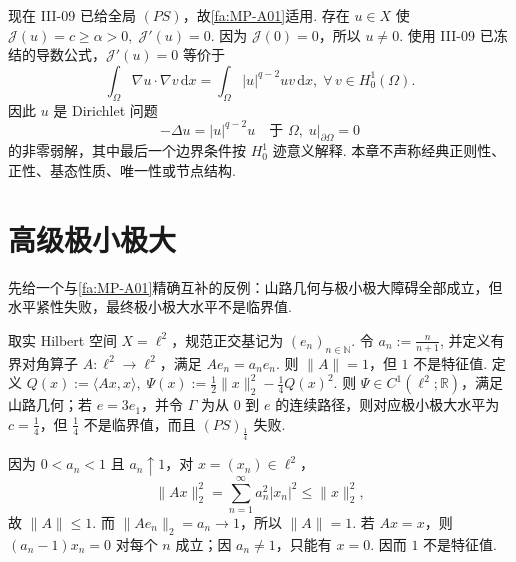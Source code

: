 现在 III-09 已给全局 \(\displaystyle(PS)\)，故\autoref{fa:MP-A01}适用. 存在 \(\displaystyle u\in X\) 使
\(\displaystyle \mathcal J(u)=c\geqslant\alpha>0, \; \mathcal J'(u)=0\).
因为 \(\displaystyle\mathcal J(0)=0\)，所以 \(\displaystyle u\neq0\). 使用 III-09 已冻结的导数公式，\(\displaystyle\mathcal J'(u)=0\) 等价于
\[
\int_\Omega\nabla u\mathbin{\cdot}\nabla v\,\mathrm{d}x
=
\int_\Omega|u|^{q-2}uv\,\mathrm{d}x,
\;
\forall\,v\in H_0^1(\Omega).
\]
因此 \(\displaystyle u\) 是 Dirichlet 问题
\[
-\Delta u=|u|^{q-2}u
\quad\text{于 }\Omega,
\;
u|_{\partial\Omega}=0
\]
的非零弱解，其中最后一个边界条件按 \(\displaystyle H_0^1\) 迹意义解释. 本章不声称经典正则性、正性、基态性质、唯一性或节点结构.

\section{高级极小极大}\label{sec:iii10-advanced-minimax}

先给一个与\autoref{fa:MP-A01}精确互补的反例：山路几何与极小极大障碍全部成立，但水平紧性失败，最终极小极大水平不是临界值.

\begin{FACounterexample}
取实 Hilbert 空间 \(\displaystyle X=\ell^2\)，规范正交基记为 \(\displaystyle(e_n)_{n\in\mathbb N}\). 令
\(\displaystyle a_n:=\frac{n}{n+1}\),
并定义有界对角算子 \(\displaystyle A:\ell^2\to\ell^2\)，满足 \(\displaystyle Ae_n=a_ne_n\). 则 \(\displaystyle\|A\|=1\)，但 \(\displaystyle1\) 不是特征值. 定义
\(\displaystyle Q(x):=\langle Ax,x\rangle, \; \Psi(x):=\frac{1}{2}\|x\|_2^2-\frac{1}{4}Q(x)^2\).
则 \(\displaystyle\Psi\in C^1(\ell^2;\mathbb R)\)，满足山路几何；若 \(\displaystyle e=3e_1\)，并令 \(\displaystyle\Gamma\) 为从 \(\displaystyle0\) 到 \(\displaystyle e\) 的连续路径，则对应极小极大水平为 \(\displaystyle c=\frac{1}{4}\)，但 \(\displaystyle\frac{1}{4}\) 不是临界值，而且 \(\displaystyle(PS)_{\frac{1}{4}}\) 失败.
\end{FACounterexample}

因为 \(\displaystyle0<a_n<1\) 且 \(\displaystyle a_n\uparrow1\)，对 \(\displaystyle x=(x_n)\in\ell^2\)，
\[
\|Ax\|_2^2
=
\sum_{n=1}^\infty a_n^2|x_n|^2
\leqslant
\|x\|_2^2,
\]
故 \(\displaystyle\|A\|\leqslant1\). 而 \(\displaystyle\|Ae_n\|_2=a_n\to1\)，所以 \(\displaystyle\|A\|=1\). 若 \(\displaystyle Ax=x\)，则 \(\displaystyle(a_n-1)x_n=0\) 对每个 \(\displaystyle n\) 成立；因 \(\displaystyle a_n\neq1\)，只能有 \(\displaystyle x=0\). 因而 \(\displaystyle1\) 不是特征值.

